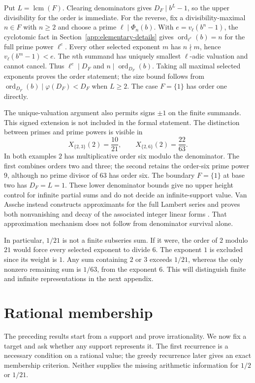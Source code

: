 \documentclass[11pt]{article}
\begin{document}
Put $L=\operatorname{lcm}(F)$.  Clearing denominators gives
$D_F\mid b^L-1$, so the upper divisibility for the order is immediate.
For the reverse, fix a divisibility-maximal $n\in F$ with $n\ge2$ and
choose a prime $\ell\mid\Phi_n(b)$. With $e=v_\ell(b^n-1)$, the
cyclotomic fact in Section~\ref{app:elementary-details} gives
$\operatorname{ord}_{\ell^e}(b)=n$ for the full prime power $\ell^e$.
Every other selected exponent $m$ has $n\nmid m$, hence
$v_\ell(b^m-1)<e$.  The $n$th summand has uniquely smallest $\ell$-adic
valuation and cannot cancel.  Thus $\ell^e\mid D_F$ and
$n\mid\operatorname{ord}_{D_F}(b)$.  Taking all maximal selected exponents
proves the order statement; the size bound follows from
$\operatorname{ord}_{D_F}(b)\mid\varphi(D_F)<D_F$ when $L\ge2$.
The case $F=\{1\}$ has order one directly.

The unique-valuation argument also permits signs $\pm1$ on the finite
summands. This signed extension is not included in the formal statement.
The distinction between primes and prime powers is visible in
\[
 X_{\{2,3\}}(2)=\frac{10}{21},\qquad
 X_{\{2,6\}}(2)=\frac{22}{63}.
\]
In both examples $2$ has multiplicative order six modulo the denominator.
The first combines orders two and three; the second retains the
order-six prime power $9$, although no prime divisor of $63$ has order six.
The boundary $F=\{1\}$ at base two has $D_F=L=1$.
These lower denominator bounds give no upper height control for infinite
partial sums and do not decide an infinite-support value.  Van Assche instead constructs approximants for the full Lambert series and proves
both nonvanishing and decay of the associated integer linear forms
\cite[Lemma~1 and (34)--(35)]{vanassche2001}.  That approximation mechanism
does not follow from denominator survival alone.


In particular, $1/21$ is not a finite subseries sum. If it were, the order
of $2$ modulo $21$ would force every selected exponent to divide $6$.
The exponent $1$ is excluded since its weight is $1$. Any sum containing
$2$ or $3$ exceeds $1/21$, whereas the only nonzero remaining sum is
$1/63$, from the exponent $6$. This will distinguish finite and infinite
representations in the next appendix.

\section{Rational membership}\label{sec:rational-membership}
The preceding results start from a support and prove irrationality.
We now fix a target and ask whether any support represents it.
The first recurrence is a necessary condition on a rational value;
the greedy recurrence later gives an exact membership criterion.
Neither supplies the missing arithmetic information for $1/2$ or $1/21$.
\end{document}

